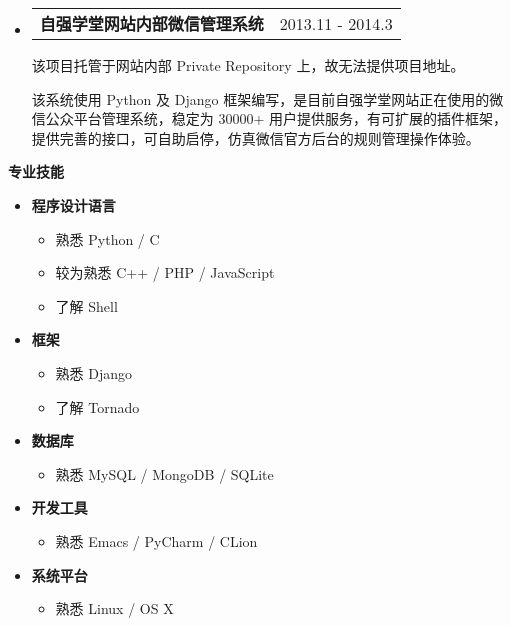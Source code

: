 \documentclass[a4paper,9pt]{article}
\makeatletter
\newcommand{\resheading}[1]{{\large \colorbox{mygrey}{\begin{minipage}{\textwidth}{\textbf{#1 \vphantom{p\^{E}}}}\end{minipage}}}}
\newcommand{\ressubheading}[2]{
  \begin{tabular*}{172mm}{l@{\extracolsep{\fill}}r}
    \textbf{#1} & #2
  \end{tabular*}\vspace{0pt}}
\makeatother
\begin{document}
\begin{itemize}
\item
  \ressubheading{自强学堂网站内部微信管理系统}{2013.11 - 2014.3}

  \begin{adjustwidth}{8mm}{8mm}

  \textnormal{该项目托管于网站内部 Private Repository 上，故无法提供项目地址。}

  \textnormal{该系统使用 Python 及 Django 框架编写，是目前自强学堂网站正在使用的微信公众平台管理系统，稳定为 30000+ 用户提供服务，有可扩展的插件框架，提供完善的接口，可自助启停，仿真微信官方后台的规则管理操作体验。}

  \end{adjustwidth}
\end{itemize}

\resheading{专业技能}
\begin{multicols}{2}
  \begin{itemize}
  \item
    \textbf{程序设计语言}
    \begin{itemize}
    \item{熟悉 Python / C}
    \item{较为熟悉 C++ / PHP / JavaScript}
    \item{了解 Shell}
    \end{itemize}
  \item
    \textbf{框架}
    \begin{itemize}
    \item{熟悉 Django}
    \item{了解 Tornado}
    \end{itemize}
  \item
    \textbf{数据库}
    \begin{itemize}
    \item{熟悉 MySQL / MongoDB / SQLite}
    \end{itemize}
  \item
    \textbf{开发工具}
    \begin{itemize}
    \item{熟悉 Emacs / PyCharm / CLion}
    \end{itemize}
  \item
    \textbf{系统平台}
    \begin{itemize}
    \item{熟悉 Linux / OS X}
    \end{itemize}
  \end{itemize}
\end{multicols}
\end{document}
